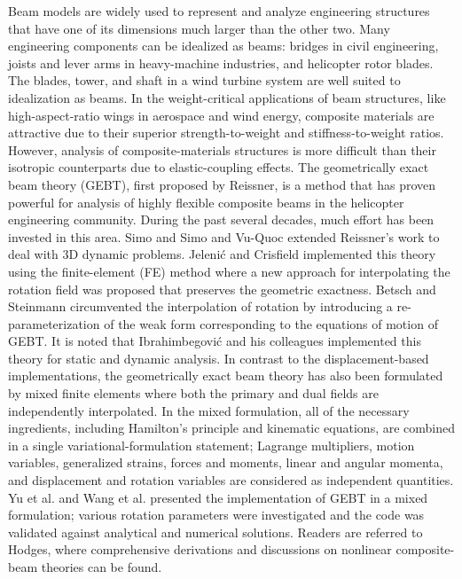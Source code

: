 Beam models are widely used to represent and analyze engineering structures
that have one of its dimensions much larger than the other two. Many
engineering components can be idealized as beams: bridges in civil
engineering, joists and lever arms in heavy-machine industries, and
helicopter rotor blades. The blades, tower, and shaft in a wind turbine
system are well suited to idealization as beams. In the weight-critical
applications of beam structures, like high-aspect-ratio wings in aerospace
and wind energy, composite materials are attractive due to their superior
strength-to-weight and stiffness-to-weight ratios.  However, analysis of
composite-materials structures is more difficult than their isotropic
counterparts due to elastic-coupling effects. The geometrically exact beam
theory (GEBT), first proposed by Reissner\cite{Ressiner1973}, is a
method that has proven powerful for analysis of highly flexible composite
beams in the helicopter engineering community. During the past several
decades, much effort has been invested in this area. Simo\cite{Simo1985} and
Simo and Vu-Quoc\cite{Simo1986} extended Reissner's work to deal with 3D
dynamic problems. Jeleni\'c and Crisfield\cite{Crisfield1999} implemented
this theory using the finite-element (FE) method where a new approach for
interpolating the rotation field was proposed that preserves the geometric
exactness. Betsch and Steinmann\cite{Betsch2002} circumvented the
interpolation of rotation by introducing a re-parameterization of the weak
form corresponding to the equations of motion of GEBT. It is noted that
Ibrahimbegovi\'c and his colleagues implemented this theory for
static\cite{Ibrahim1995} and dynamic\cite{Ibrahim1998} analysis. In contrast
to the displacement-based implementations, the geometrically exact beam theory
has also been formulated by mixed finite elements where both the primary and
dual fields are independently interpolated\cite{CookFEM}.  In the mixed formulation, all of the necessary
ingredients, including Hamilton's principle and kinematic equations, are
combined in a single variational-formulation statement; Lagrange
multipliers, motion variables, generalized strains, forces and moments,
linear and angular momenta, and displacement and rotation variables are
considered as independent quantities. Yu et al.\cite{YuGEBT} and Wang et
al.\cite{Wang:GEBT2013}
presented the implementation of GEBT in a mixed formulation; various
rotation parameters were investigated and the code was validated against
analytical and numerical solutions. Readers are referred to
Hodges\cite{HodgesBeamBook}, where comprehensive derivations and discussions
on nonlinear composite-beam theories can be found.

